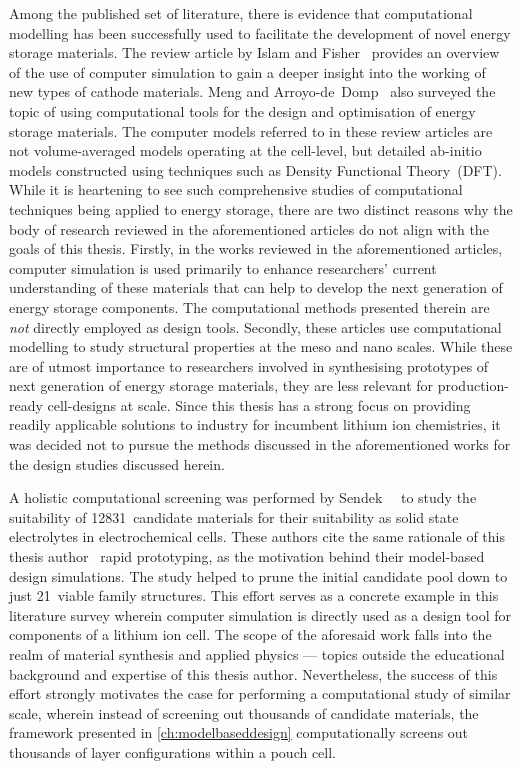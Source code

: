 Among  the published  set of  literature, there  is evidence  that computational
modelling  has  been   successfully  used  to  facilitate   the  development  of
novel   energy   storage   materials.   The  review   article   by   Islam   and
Fisher~\cite{Islam2014} provides an  overview of the use  of computer simulation
to gain  a deeper insight  into the working of  new types of  cathode materials.
Meng  and  Arroyo-de~Domp~\cite{Meng2009}  also  surveyed  the  topic  of  using
computational tools for the design and optimisation of energy storage materials.
The computer models referred to in these review articles are not volume-averaged
models operating  at the cell-level,  but detailed ab-initio  models constructed
using techniques such as Density Functional Theory~(DFT). While it is heartening
to see such  comprehensive studies of computational techniques  being applied to
energy storage, there are two distinct reasons why the body of research reviewed
in  the aforementioned  articles do  not align  with the  goals of  this thesis.
Firstly,  in  the  works  reviewed  in  the  aforementioned  articles,  computer
simulation is  used primarily to  enhance researchers' current  understanding of
these materials that  can help to develop the next  generation of energy storage
components. The computational methods  presented therein are \emph{not} directly
employed as design  tools. Secondly, these articles  use computational modelling
to study  structural properties  at the  meso and nano  scales. While  these are
of  utmost importance  to  researchers involved  in  synthesising prototypes  of
next  generation  of  energy  storage  materials, they  are  less  relevant  for
production-ready cell-designs at scale. Since this  thesis has a strong focus on
providing readily  applicable solutions  to industry  for incumbent  lithium ion
chemistries,  it  was  decided  not  to pursue  the  methods  discussed  in  the
aforementioned works for the design studies discussed herein.

A      holistic      computational      screening     was      performed      by
Sendek~\etal~\cite{Sendek2017}  to  study  the  suitability  of  12831~candidate
materials for their  suitability as solid state  electrolytes in electrochemical
cells. These  authors cite the  same rationale  of this thesis  author \ie~rapid
prototyping, as the motivation behind  their model-based design simulations. The
study helped to  prune the initial candidate pool down  to just 21~viable family
structures. This effort  serves as a concrete example in  this literature survey
wherein computer simulation is directly used  as a design tool for components of
a lithium  ion cell. The  scope of  the aforesaid work  falls into the  realm of
material  synthesis  and applied  physics  ---  topics outside  the  educational
background and  expertise of  this thesis author.  Nevertheless, the  success of
this effort  strongly motivates  the case for  performing a  computational study
of  similar scale,  wherein  instead  of screening  out  thousands of  candidate
materials, the framework presented in \cref{ch:modelbaseddesign} computationally
screens out thousands of layer configurations within a pouch cell.


